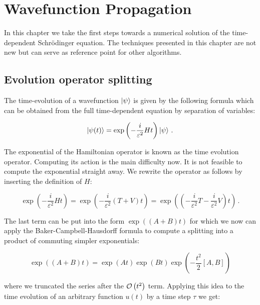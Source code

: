 \chapter{Wavefunction Propagation}
\label{ch:fourier}


In this chapter we take the first steps towards a numerical solution of the
time-dependent Schrödinger equation. The techniques presented in this chapter
are not new but can serve as reference point for other algorithms.


\section{Evolution operator splitting}


The time-evolution of a wavefunction $\Ket{\psi}$ is given by the following
formula which can be obtained from the full time-dependent equation by
separation of variables:

\begin{equation}
  \Ket{\psi(t)} = \exp\left(-\frac{i}{\varepsilon^2} H t\right) \Ket{\psi} \,.
\end{equation}

The exponential of the Hamiltonian operator is known as the time evolution
operator. Computing its action is the main difficulty now. It is not feasible
to compute the exponential straight away. We rewrite the operator as follows
by inserting the definition of $H$:

\begin{equation*}
  \exp\left(-\frac{i}{\varepsilon^2} H t\right)
  = \exp\left(-\frac{i}{\varepsilon^2} \left(T + V\right) t\right)
  = \exp\left(\left(-\frac{i}{\varepsilon^2} T -\frac{i}{\varepsilon^2} V\right) t\right) \,.
\end{equation*}

The last term can be put into the form $\exp\left(\left(A + B\right) t\right)$ for
which we now can apply the Baker-Campbell-Hausdorff formula to compute a splitting
into a product of commuting simpler exponentials:

\begin{equation*}
  \exp\left(\left(A + B\right) t\right)
  = \exp\left(At\right) \exp\left(Bt\right)
    \exp\left(-\frac{t^2}{2}[A,B]\right)
\end{equation*}

where we truncated the series after the $\mathcal{O}\left( t^2 \right)$ term. Applying this idea
to the time evolution of an arbitrary function $u(t)$ by a time step $\tau$ we get:

